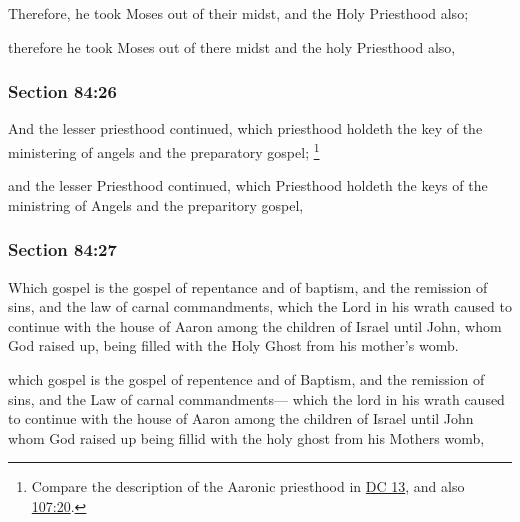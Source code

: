 		Therefore, he took Moses out of their midst, and the Holy Priesthood also;

		\begin{framed}
		\scriptsize
			\begin{compactdesc}
				\item[JSP] therefore he took Moses out of there midst and the holy Priesthood also,
			\end{compactdesc}
		\end{framed}

	\subsubsection{Section 84:26} %
		\label{DC84-26}

		And the lesser priesthood continued, which priesthood holdeth the key of the ministering of angels and the preparatory gospel;%
			\footnote{%
				Compare the description of the Aaronic priesthood in \hyperref[DC13-1]{DC 13}, and also \hyperref[DC107-20]{107:20}.
				}

		\begin{framed}
		\scriptsize
			\begin{compactdesc}
				\item[JSP] and the lesser Priesthood continued, which Priesthood holdeth the keys of the ministring of Angels and the preparitory gospel,
			\end{compactdesc}
		\end{framed}

	\subsubsection{Section 84:27} %
		\label{DC84-27}

		Which gospel is the gospel of repentance and of baptism, and the remission of sins, and the law of carnal commandments, which the Lord in his wrath caused to continue with the house of Aaron among the children of Israel until John, whom God raised up, being filled with the Holy Ghost from his mother's womb.

		\begin{framed}
		\scriptsize
			\begin{compactdesc}
				\item[JSP] which gospel is the gospel of repentence and of Baptism, and the remission of sins, and the Law of carnal commandments--- which the lord in his wrath caused to continue with the house of Aaron among the children of Israel until John whom God raised up being fillid with the holy ghost from his Mothers womb,
			\end{compactdesc}
		\end{framed}

